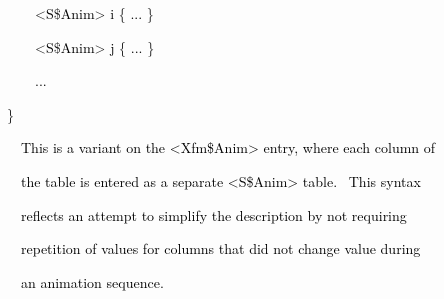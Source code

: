 \documentclass[a4paper]{article}
\newcommand\textstyleOOoComputerKeyWord[1]{\textrm{\textcolor[rgb]{0.0,0.0,0.5019608}{#1}}}
\newcommand\textstyleOOoAssemblerSpecialChar[1]{\textrm{\textcolor[rgb]{0.0,0.5019608,0.0}{#1}}}
\newcommand\textstyleOOoAssemblerIdent[1]{\textrm{\textcolor{black}{#1}}}
\begin{document}
{\color{black}
\textstyleOOoComputerKeyWord{\textcolor{black}{\ \ \ \ \ \ }}\textstyleOOoAssemblerSpecialChar{{\textless}}\textstyleOOoAssemblerIdent{S}\textstyleOOoAssemblerSpecialChar{\$}\textstyleOOoAssemblerIdent{Anim}\textstyleOOoAssemblerSpecialChar{{\textgreater}}\textstyleOOoComputerKeyWord{\textcolor{black}{
}}\textstyleOOoAssemblerIdent{i}\textstyleOOoComputerKeyWord{\textcolor{black}{
}}\textstyleOOoAssemblerSpecialChar{\{}\textstyleOOoComputerKeyWord{\textcolor{black}{
}}\textstyleOOoAssemblerIdent{...}\textstyleOOoComputerKeyWord{\textcolor{black}{
}}\textstyleOOoAssemblerSpecialChar{\}}}

{\color{black}
\textstyleOOoComputerKeyWord{\textcolor{black}{\ \ \ \ \ \ }}\textstyleOOoAssemblerSpecialChar{{\textless}}\textstyleOOoAssemblerIdent{S}\textstyleOOoAssemblerSpecialChar{\$}\textstyleOOoAssemblerIdent{Anim}\textstyleOOoAssemblerSpecialChar{{\textgreater}}\textstyleOOoComputerKeyWord{\textcolor{black}{
}}\textstyleOOoAssemblerIdent{j}\textstyleOOoComputerKeyWord{\textcolor{black}{
}}\textstyleOOoAssemblerSpecialChar{\{}\textstyleOOoComputerKeyWord{\textcolor{black}{
}}\textstyleOOoAssemblerIdent{...}\textstyleOOoComputerKeyWord{\textcolor{black}{
}}\textstyleOOoAssemblerSpecialChar{\}}}

{\color{black}
\textstyleOOoComputerKeyWord{\textcolor{black}{\ \ \ \ \ \ }}\textstyleOOoAssemblerIdent{...}}

{\color{black}
\textstyleOOoComputerKeyWord{\textcolor{black}{\ \ }}\textstyleOOoAssemblerSpecialChar{\}}}


\bigskip

\clearpage
\bigskip

{\color{black}
\textstyleOOoComputerKeyWord{\textcolor{black}{\ \ \ \ This is a variant on the {\textless}Xfm\$Anim{\textgreater}
entry, where each column of}}}

{\color{black}
\textstyleOOoComputerKeyWord{\textcolor{black}{\ \ \ \ the table is entered as a separate
{\textless}S\$Anim{\textgreater} table. \ This syntax}}}

{\color{black}
\textstyleOOoComputerKeyWord{\textcolor{black}{\ \ \ \ reflects an attempt to simplify the description by not
requiring}}}

{\color{black}
\textstyleOOoComputerKeyWord{\textcolor{black}{\ \ \ \ repetition of values for columns that did not change value
during}}}

{\color{black}
\textstyleOOoComputerKeyWord{\textcolor{black}{\ \ \ \ an animation sequence.}}}
\end{document}
